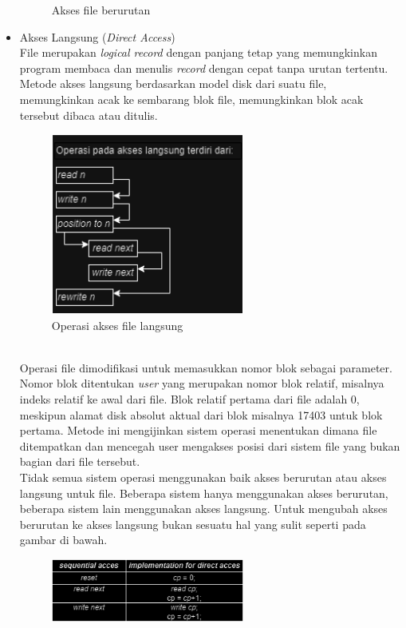\documentclass[12pt]{article}
\begin{document}
\begin{itemize}
\begin{figure}[h]
            \caption{Akses file berurutan}
        \end{figure}
    \item Akses Langsung (\textit{Direct Access})
        \\File merupakan \textit{logical record} dengan panjang tetap yang memungkinkan program membaca dan menulis \textit{record} dengan cepat tanpa urutan tertentu. Metode akses langsung berdasarkan model disk dari suatu file, memungkinkan acak ke sembarang blok file, memungkinkan blok acak tersebut dibaca atau ditulis.
        \begin{figure}[h]
			\centering
			\includegraphics[width=0.6\textwidth]{asset/gambar3.png}
            \caption{Operasi akses file langsung}
        \end{figure}
        \\Operasi file dimodifikasi untuk memasukkan nomor blok sebagai parameter. Nomor blok ditentukan \textit{user} yang merupakan nomor blok relatif, misalnya indeks relatif ke awal dari file. Blok relatif pertama dari file adalah 0, meskipun alamat disk absolut aktual dari blok misalnya 17403 untuk blok pertama. Metode ini mengijinkan sistem operasi menentukan dimana file ditempatkan dan mencegah user mengakses posisi dari sistem file yang bukan bagian dari file tersebut. 
        \\Tidak semua sistem operasi menggunakan baik akses berurutan atau akses langsung untuk file. Beberapa sistem hanya menggunakan akses berurutan, beberapa sistem lain menggunakan akses langsung. Untuk mengubah akses berurutan ke akses langsung bukan sesuatu hal yang sulit seperti pada gambar di bawah.
        \begin{figure}[h]
			\centering
			\includegraphics[width=0.6\textwidth]{asset/gambar4.png}

\end{figure}
\end{itemize}
\end{document}
